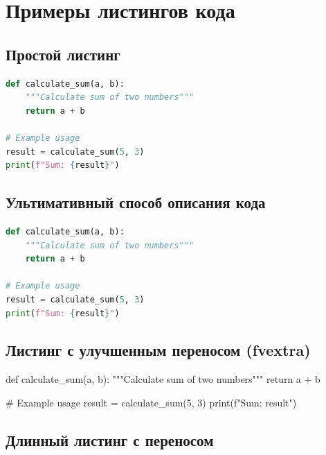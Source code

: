 \section{Примеры листингов кода}

\subsection{Простой листинг}

\begin{lstlisting}[language=Python, caption={Пример простого алгоритма}, label={lst:simple_algorithm}]
def calculate_sum(a, b):
    """Calculate sum of two numbers"""
    return a + b

# Example usage
result = calculate_sum(5, 3)
print(f"Sum: {result}")
\end{lstlisting}

\subsection{Ультимативный способ описания кода}

\begin{lstlisting}[style=code, language=Python, caption={Пример Python кода с улучшенной подсветкой}, label={lst:python_enhanced}]
def calculate_sum(a, b):
    """Calculate sum of two numbers"""
    return a + b

# Example usage
result = calculate_sum(5, 3)
print(f"Sum: {result}")
\end{lstlisting}

\subsection{Листинг с улучшенным переносом (fvextra)}

\begin{CodeBreakable}
def calculate_sum(a, b):
    """Calculate sum of two numbers"""
    return a + b

# Example usage
result = calculate_sum(5, 3)
print(f"Sum: {result}")
\end{CodeBreakable}

\subsection{Длинный листинг с переносом}

